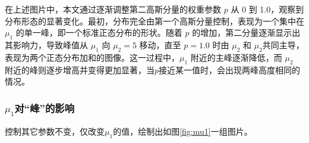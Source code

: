 \documentclass{article}
\begin{document}
在上述图片中，本文通过逐渐调整第二高斯分量的权重参数 \( p \) 从 0 到 1.0，观察到分布形态的显著变化。最初，分布完全由第一个高斯分量控制，表现为一个集中在 \( \mu_1 \) 的单一峰，即一个标准正态分布的形状。随着 \( p \) 的增加，第二分量逐渐显示出其影响力，导致峰值从 \( \mu_1 \) 向 \( \mu_2 = 5 \) 移动，直至 \( p = 1.0 \) 时由 \( \mu_2 \) 和 \( \mu_2 \)共同主导，表现为两个正态分布加和的图像。这一过程中，\( \mu_1 \) 附近的主峰逐渐降低，而 \( \mu_2 \) 附近的峰则逐步增高并变得更加显著，当$p$接近某一值时，会出现两峰高度相同的情况。\label{sec:p}

\subsubsection{\texorpdfstring{$\mu_1$对“峰”的影响}{mu1对“峰”的影响}}

控制其它参数不变，仅改变$\mu_1$的值，绘制出如图\ref{fig:mu1}一组图片。
\end{document}
